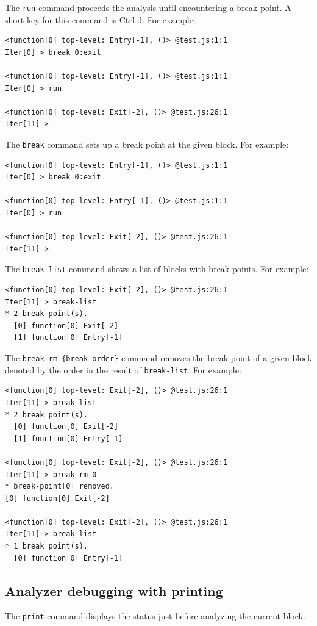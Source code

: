 \medskip
The \verb!run! command proceeds the analysis until encountering a break
point.  A short-key for this command is Ctrl-d.  For example:
{\small
\begin{verbatim}
<function[0] top-level: Entry[-1], ()> @test.js:1:1
Iter[0] > break 0:exit

<function[0] top-level: Entry[-1], ()> @test.js:1:1
Iter[0] > run

<function[0] top-level: Exit[-2], ()> @test.js:26:1
Iter[11] >
\end{verbatim}
}

\medskip
The \verb!break! command sets up a break point at the given block.
For example:
{\small
\begin{verbatim}
<function[0] top-level: Entry[-1], ()> @test.js:1:1
Iter[0] > break 0:exit

<function[0] top-level: Entry[-1], ()> @test.js:1:1
Iter[0] > run

<function[0] top-level: Exit[-2], ()> @test.js:26:1
Iter[11] >
\end{verbatim}
}

\medskip
The \verb!break-list! command shows a list of blocks with
break points.  For example:
{\small
\begin{verbatim}
<function[0] top-level: Exit[-2], ()> @test.js:26:1
Iter[11] > break-list
* 2 break point(s).
  [0] function[0] Exit[-2]
  [1] function[0] Entry[-1]
\end{verbatim}
}

\medskip
The \verb!break-rm {break-order}! command
removes the break point of a given block
denoted by the order in the result of \verb!break-list!.
For example:
{\small
\begin{verbatim}
<function[0] top-level: Exit[-2], ()> @test.js:26:1
Iter[11] > break-list
* 2 break point(s).
  [0] function[0] Exit[-2]
  [1] function[0] Entry[-1]

<function[0] top-level: Exit[-2], ()> @test.js:26:1
Iter[11] > break-rm 0
* break-point[0] removed.
[0] function[0] Exit[-2]

<function[0] top-level: Exit[-2], ()> @test.js:26:1
Iter[11] > break-list
* 1 break point(s).
  [0] function[0] Entry[-1]
\end{verbatim}
}

\subsection{Analyzer debugging with printing}
\label{s:3:2:1:refman}
The \verb!print! command displays the status just before
analyzing the current block.

